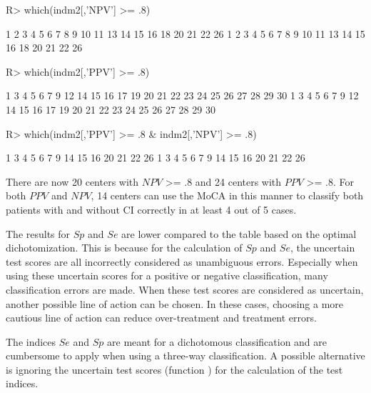 \documentclass[
  nojss]{jss}
\begin{document}
\begin{CodeChunk}

\begin{CodeInput}
R> which(indm2[,'NPV'] >= .8)
\end{CodeInput}

\begin{CodeOutput}
 1  2  3  4  5  6  7  8  9 10 11 13 14 15 16 18 20 21 22 26 
 1  2  3  4  5  6  7  8  9 10 11 13 14 15 16 18 20 21 22 26 
\end{CodeOutput}

\begin{CodeInput}
R> which(indm2[,'PPV'] >= .8)
\end{CodeInput}

\begin{CodeOutput}
 1  3  4  5  6  7  9 12 14 15 16 17 19 20 21 22 23 24 25 26 27 28 29 30 
 1  3  4  5  6  7  9 12 14 15 16 17 19 20 21 22 23 24 25 26 27 28 29 30 
\end{CodeOutput}

\begin{CodeInput}
R> which(indm2[,'PPV'] >= .8 & indm2[,'NPV'] >= .8)
\end{CodeInput}

\begin{CodeOutput}
 1  3  4  5  6  7  9 14 15 16 20 21 22 26 
 1  3  4  5  6  7  9 14 15 16 20 21 22 26 
\end{CodeOutput}
\end{CodeChunk}

There are now 20 centers with \(NPV\) \textgreater= .8 and 24 centers
with \(PPV\) \textgreater= .8. For both \(PPV\) and \(NPV\), 14 centers
can use the MoCA in this manner to classify both patients with and
without CI correctly in at least 4 out of 5 cases.

The results for \(Sp\) and \(Se\) are lower compared to the table based
on the optimal dichotomization. This is because for the calculation of
\(Sp\) and \(Se\), the uncertain test scores are all incorrectly
considered as unambiguous errors. Especially when using these uncertain
scores for a positive or negative classification, many classification
errors are made. When these test scores are considered as uncertain,
another possible line of action can be chosen. In these cases, choosing
a more cautious line of action can reduce over-treatment and treatment
errors.

The indices \(Se\) and \(Sp\) are meant for a dichotomous classification
and are cumbersome to apply when using a three-way classification. A
possible alternative is ignoring the uncertain test scores (function
) for the calculation of the test indices.
\end{document}
